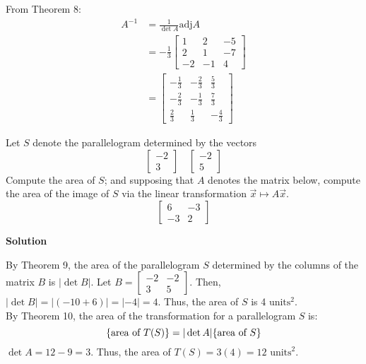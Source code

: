 \documentclass[11pt]{scrartcl}
\theoremstyle{dotlessP}
\theoremstyle{dotlessN}
\DeclarePairedDelimiter\set{\{}{\}}
\begin{document}
From Theorem 8:
\begin{align*}
	A^{-1} &= \frac{1}{\det A} \text{adj} A \\
		  &= -\frac{1}{3} 	\begin{bmatrix}
		1 & 2 & -5 \\
		2 & 1 & -7 \\
		-2 & -1 & 4
	\end{bmatrix} \\
		  &= 
\begin{bmatrix}
	-\frac{1}{3} & -\frac{2}{3} & \frac{5}{3} \\
	-\frac{2}{3} & -\frac{1}{3} & \frac{7}{3} \\
	\frac{2}{3} & \frac{1}{3} & -\frac{4}{3}
\end{bmatrix}
\end{align*}
\begin{ques}
	Let $S$ denote the parallelogram determined by the vectors
	\[
	\begin{bmatrix}
		-2 \\
		3
	\end{bmatrix} \quad
	\begin{bmatrix}
		-2 \\
		5
	\end{bmatrix}
	\] 
	Compute the area of $S$; and supposing that $A$ denotes the matrix below, compute the area of the image of $S$ via the linear transformation $\vec{x} \mapsto A\vec{x}$.
	\[
	\begin{bmatrix}
		6 & -3 \\
		-3 & 2
	\end{bmatrix}
	\] 
\end{ques}
\textbf{Solution}

By Theorem 9, the area of the parallelogram $S$ determined by the columns of the matrix $B$ is $|\det B|$. Let $B = 
\begin{bmatrix}
	-2 & -2 \\
	3 & 5
\end{bmatrix}
$. Then, $|\det B| = |(-10 + 6)| =|-4| = 4$. Thus, the area of  $S$ is 4 $\text{units}^2$.
\\

By Theorem  10, the area of the transformation for a parallelogram $S$ is:
\[
 \set*{\text{area of } T(S)} = | \det A| \set*{\text{area of } S}
\]
$\det A = 12 - 9 = 3$. Thus, the area of  $T(S) = 3(4) = 12 \text{ units}^2$.
\end{document}
